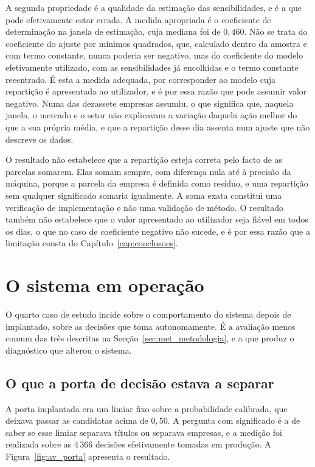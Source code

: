 A segunda propriedade é a qualidade da estimação das sensibilidades, e é a que pode efetivamente
estar errada. A medida apropriada é o coeficiente de determinação na janela de estimação, cuja
mediana foi de $0{,}460$. Não se trata do coeficiente do ajuste por mínimos quadrados, que, calculado
dentro da amostra e com termo constante, nunca poderia ser negativo, mas do coeficiente do modelo
efetivamente utilizado, com as sensibilidades já encolhidas e o termo constante recentrado. É esta a
medida adequada, por corresponder ao modelo cuja repartição é apresentada ao utilizador, e é por essa
razão que pode assumir valor negativo. Numa das dezassete empresas assumiu, o que significa que,
naquela janela, o mercado e o setor não explicavam a variação daquela ação melhor do que a sua própria
média, e que a repartição desse dia assenta num ajuste que não descreve os dados.

O resultado não estabelece que a repartição esteja correta pelo facto de as parcelas somarem. Elas
somam sempre, com diferença nula até à precisão da máquina, porque a parcela da empresa é definida
como resíduo, e uma repartição sem qualquer significado somaria igualmente. A soma exata constitui
uma verificação de implementação e não uma validação de método. O resultado também não estabelece que
o valor apresentado ao utilizador seja fiável em todos os dias, o que no caso de coeficiente negativo
não sucede, e é por essa razão que a limitação consta do Capítulo~\ref{cap:conclusoes}.

\section{O sistema em operação}
\label{sec:av_producao}

O quarto caso de estudo incide sobre o comportamento do sistema depois de implantado, sobre as
decisões que toma autonomamente. É a avaliação menos comum das três descritas na
Secção~\ref{sec:met_metodologia}, e a que produz o diagnóstico que alterou o sistema.

\subsection{O que a porta de decisão estava a separar}

A porta implantada era um limiar fixo sobre a probabilidade calibrada, que deixava passar as
candidatas acima de $0{,}50$. A pergunta com significado é a de saber se esse limiar separava títulos
ou separava empresas, e a medição foi realizada sobre as $4\,366$ decisões efetivamente tomadas em
produção. A Figura~\ref{fig:av_porta} apresenta o resultado.


